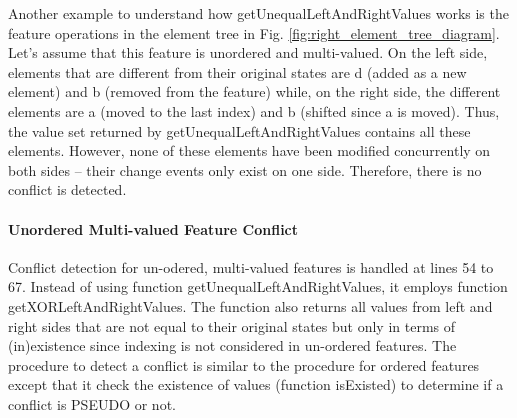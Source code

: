 Another example to understand how \textsf{getUnequalLeftAndRightValues} works is the feature \textsf{operations} in the element tree in Fig. \ref{fig:right_element_tree_diagram}. Let's assume that this feature is unordered and multi-valued. On the left side, elements that are different from their original states are \textsf{d} (added as a new element) and \textsf{b} (removed from the feature) while, on the right side, the different elements are \textsf{a} (moved to the last index) and \textsf{b} (shifted since \textsf{a} is moved). Thus, the value set returned by \textsf{getUnequalLeftAndRightValues} contains all these elements. However, none of these elements have been modified concurrently on both sides -- their change events only exist on one side. Therefore, there is no conflict is detected. 

\paragraph{Unordered Multi-valued Feature Conflict} 
\label{sec:unordered_conflict}
Conflict detection for un-odered, multi-valued features is handled at lines 54 to 67. Instead of using function \textsf{getUnequalLeftAndRightValues}, it employs function \textsf{getXORLeftAndRightValues}. The function also returns all values from left and right sides that are not equal to their original states but only in terms of (in)existence since indexing is not considered in un-ordered features. The procedure to detect a conflict is similar to the procedure for ordered features except that it check the existence of values (function \textsf{isExisted}) to determine if a conflict is \textsf{PSEUDO} or not.

